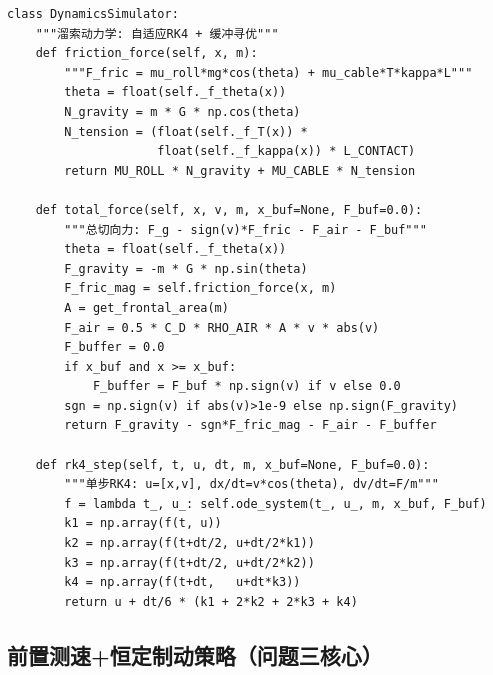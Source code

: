 \documentclass[12pt,a4paper]{ctexart}
\begin{document}
{\small
\begin{lstlisting}
class DynamicsSimulator:
    """溜索动力学: 自适应RK4 + 缓冲寻优"""
    def friction_force(self, x, m):
        """F_fric = mu_roll*mg*cos(theta) + mu_cable*T*kappa*L"""
        theta = float(self._f_theta(x))
        N_gravity = m * G * np.cos(theta)
        N_tension = (float(self._f_T(x)) *
                     float(self._f_kappa(x)) * L_CONTACT)
        return MU_ROLL * N_gravity + MU_CABLE * N_tension

    def total_force(self, x, v, m, x_buf=None, F_buf=0.0):
        """总切向力: F_g - sign(v)*F_fric - F_air - F_buf"""
        theta = float(self._f_theta(x))
        F_gravity = -m * G * np.sin(theta)
        F_fric_mag = self.friction_force(x, m)
        A = get_frontal_area(m)
        F_air = 0.5 * C_D * RHO_AIR * A * v * abs(v)
        F_buffer = 0.0
        if x_buf and x >= x_buf:
            F_buffer = F_buf * np.sign(v) if v else 0.0
        sgn = np.sign(v) if abs(v)>1e-9 else np.sign(F_gravity)
        return F_gravity - sgn*F_fric_mag - F_air - F_buffer

    def rk4_step(self, t, u, dt, m, x_buf=None, F_buf=0.0):
        """单步RK4: u=[x,v], dx/dt=v*cos(theta), dv/dt=F/m"""
        f = lambda t_, u_: self.ode_system(t_, u_, m, x_buf, F_buf)
        k1 = np.array(f(t, u))
        k2 = np.array(f(t+dt/2, u+dt/2*k1))
        k3 = np.array(f(t+dt/2, u+dt/2*k2))
        k4 = np.array(f(t+dt,   u+dt*k3))
        return u + dt/6 * (k1 + 2*k2 + 2*k3 + k4)
\end{lstlisting}
}

\subsection{前置测速+恒定制动策略（问题三核心）}
\end{document}
